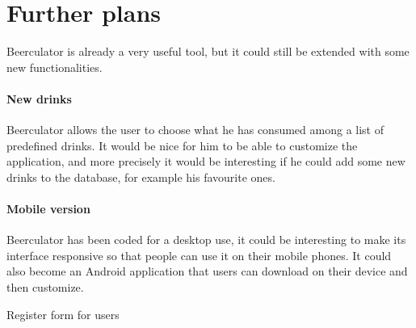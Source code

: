 \section{Further plans}
\label{sec:ideas}

Beerculator is already a very useful tool, but it could still be extended with some new functionalities. 

\paragraph{New drinks} Beerculator allows the user to choose what he has consumed among a list of predefined drinks. It would be nice for him to be able to customize the application, and more precisely it would be interesting if he could add some new drinks to the database, for example his favourite ones.
\paragraph{Mobile version} Beerculator has been coded for a desktop use, it could be interesting to make its interface responsive so that people can use it on their mobile phones. It could also become an Android application that users can download on their device and then customize.

Register form for users\\
